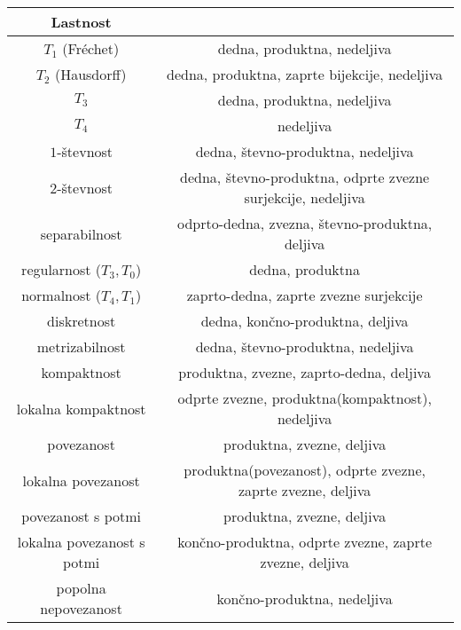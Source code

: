 \documentclass[10pt,a4paper]{article}
\begin{document}
\begin{table}[htbp]
\begin{tabular}{|c|c|}
    Lastnost &  \\ \hline \hline
    $T_1$ (Fréchet) & dedna, produktna, nedeljiva \\ \hline
    $T_2$ (Hausdorff) & dedna, produktna, zaprte bijekcije, nedeljiva \\ \hline
    $T_3$ & dedna, produktna, nedeljiva \\ \hline
    $T_4$ & nedeljiva \\ \hline
    $1$-števnost & dedna, števno-produktna, nedeljiva \\ \hline
    $2$-števnost & dedna, števno-produktna, odprte zvezne surjekcije, nedeljiva \\ \hline
    separabilnost & odprto-dedna, zvezna, števno-produktna, deljiva \\ \hline
    regularnost ($T_3, T_0$) & dedna, produktna \\ \hline
    normalnost ($T_4, T_1$) & zaprto-dedna, zaprte zvezne surjekcije \\ \hline
    diskretnost & dedna, končno-produktna, deljiva \\ \hline
    metrizabilnost & dedna, števno-produktna, nedeljiva \\ \hline
    kompaktnost & produktna, zvezne, zaprto-dedna, deljiva \\ \hline
    lokalna kompaktnost & odprte zvezne, produktna(kompaktnost), nedeljiva \\ \hline
    povezanost & produktna, zvezne, deljiva \\ \hline
    lokalna povezanost & produktna(povezanost), odprte zvezne, zaprte zvezne, deljiva\\ \hline
    povezanost s potmi & produktna, zvezne, deljiva \\ \hline
    lokalna povezanost s potmi & končno-produktna, odprte zvezne, zaprte zvezne, deljiva \\ \hline
    popolna nepovezanost & končno-produktna, nedeljiva \\ \hline
    \end{tabular}
    \end{table}
\end{document}
